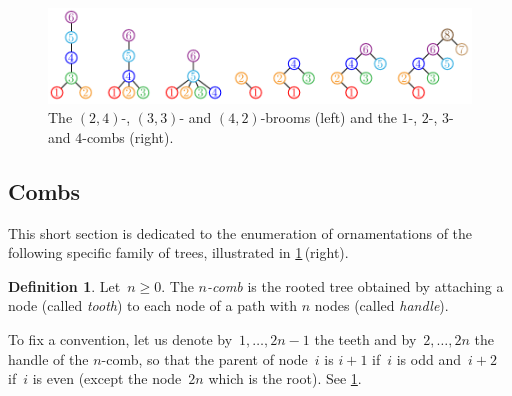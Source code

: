 \documentclass{amsart}
\theoremstyle{definition}
\newtheorem{definition}[theorem]{Definition}
\newcommand{\darkblue}{\color{darkblue}} %
\newcommand{\defn}[1]{\textsl{\darkblue #1}} %
\begin{document}


\begin{figure}
	\centerline{\includegraphics[scale=.8]{broomsCombs}}
	\caption{The $(2,4)$-, $(3,3)$- and $(4,2)$-brooms (left) and the $1$-, $2$-, $3$- and $4$-combs (right).}
	\label{fig:broomsCombs}
\end{figure}

\subsection{Combs}
\label{subsec:combs}

This short section is dedicated to the enumeration of ornamentations of the following specific family of trees, illustrated in \cref{fig:broomsCombs}\,(right).


\begin{definition}
Let~$n \ge 0$.
The \defn{$n$-comb} is the rooted tree obtained by attaching a node (called \defn{tooth}) to each node of a path with $n$ nodes (called \defn{handle}).
\end{definition}

To fix a convention, let us denote by~$1, \dots, 2n-1$ the teeth and by~$2, \dots, 2n$ the handle of the $n$-comb, so that the parent of node~$i$ is $i+1$ if~$i$ is odd and~$i+2$ if~$i$ is even (except the node~$2n$ which is the root).
See \cref{fig:broomsCombs}.
\end{document}
